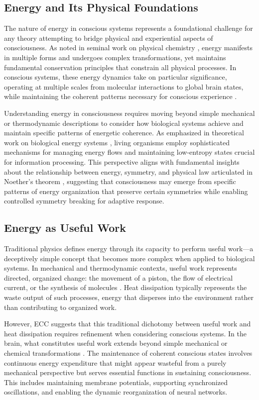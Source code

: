 \begin{refsection}
\section{Energy and Its Physical Foundations}

The nature of energy in conscious systems represents a foundational challenge for any theory attempting to bridge physical and experiential aspects of consciousness. As noted in seminal work on physical chemistry \cite{Atkins2010}, energy manifests in multiple forms and undergoes complex transformations, yet maintains fundamental conservation principles that constrain all physical processes. In conscious systems, these energy dynamics take on particular significance, operating at multiple scales from molecular interactions to global brain states, while maintaining the coherent patterns necessary for conscious experience \cite{Demetrius2015}.

Understanding energy in consciousness requires moving beyond simple mechanical or thermodynamic descriptions to consider how biological systems achieve and maintain specific patterns of energetic coherence. As emphasized in theoretical work on biological energy systems \cite{Qian2007}, living organisms employ sophisticated mechanisms for managing energy flows and maintaining low-entropy states crucial for information processing. This perspective aligns with fundamental insights about the relationship between energy, symmetry, and physical law articulated in Noether's theorem \cite{Kosmann-Schwarzbach2011}, suggesting that consciousness may emerge from specific patterns of energy organization that preserve certain symmetries while enabling controlled symmetry breaking for adaptive response.

\subsection{Energy as Useful Work}

Traditional physics defines energy through its capacity to perform useful work—a deceptively simple concept that becomes more complex when applied to biological systems. In mechanical and thermodynamic contexts, useful work represents directed, organized change: the movement of a piston, the flow of electrical current, or the synthesis of molecules \cite{Atkins2010}. Heat dissipation typically represents the waste output of such processes, energy that disperses into the environment rather than contributing to organized work.

However, ECC suggests that this traditional dichotomy between useful work and heat dissipation requires refinement when considering conscious systems. In the brain, what constitutes useful work extends beyond simple mechanical or chemical transformations \cite{Qian2007}. The maintenance of coherent conscious states involves continuous energy expenditure that might appear wasteful from a purely mechanical perspective but serves essential functions in sustaining consciousness. This includes maintaining membrane potentials, supporting synchronized oscillations, and enabling the dynamic reorganization of neural networks.


\end{refsection}
